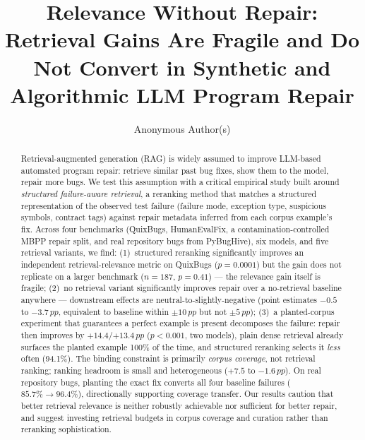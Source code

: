 \documentclass[sigconf,review,anonymous]{acmart}
\newcommand{\pp}{\,pp}
\begin{document}
\title[Relevance Without Repair]{Relevance Without Repair: Retrieval Gains Are
  Fragile and Do Not Convert in Synthetic and Algorithmic LLM Program Repair}

\author{Anonymous Author(s)}

\begin{abstract}
Retrieval-augmented generation (RAG) is widely assumed to improve LLM-based
automated program repair: retrieve similar past bug fixes, show them to the
model, repair more bugs. We test this assumption with a critical empirical
study built around \emph{structured failure-aware retrieval}, a reranking
method that matches a structured representation of the observed test failure
(failure mode, exception type, suspicious symbols, contract tags) against
repair metadata inferred from each corpus example's fix. Across four benchmarks
(QuixBugs, HumanEvalFix, a contamination-controlled MBPP repair split, and
real repository bugs from PyBugHive), six models, and five retrieval variants,
we find: (1)~structured reranking significantly improves an independent
retrieval-relevance metric on QuixBugs ($p{=}0.0001$) but the gain does not
replicate on a larger benchmark ($n{=}187$, $p{=}0.41$) --- the relevance gain
itself is fragile; (2)~no retrieval variant significantly improves repair over
a no-retrieval baseline anywhere --- downstream effects are
neutral-to-slightly-negative (point estimates $-0.5$ to $-3.7\pp$, equivalent
to baseline within $\pm 10\pp$ but not $\pm 5\pp$); (3)~a planted-corpus
experiment that guarantees a perfect example is present decomposes the failure:
repair then improves by $+14.4$/$+13.4\pp$ ($p{<}0.001$, two models), plain
dense retrieval already surfaces the planted example 100\% of the time, and
structured reranking selects it \emph{less} often (94.1\%). The binding
constraint is primarily \emph{corpus coverage}, not retrieval ranking; ranking
headroom is small and heterogeneous ($+7.5$ to $-1.6\pp$). On real repository
bugs, planting the exact fix converts all four baseline failures
($85.7\%{\to}96.4\%$), directionally supporting coverage transfer.
Our results caution that better retrieval relevance is neither robustly
achievable nor sufficient for better repair, and suggest investing retrieval
budgets in corpus coverage and curation rather than reranking sophistication.
\end{abstract}
\end{document}

